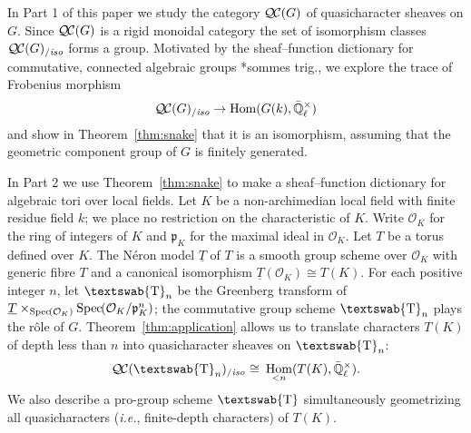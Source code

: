\documentclass[11pt]{amsart}
\newcommand{\mathswab}[1]{\operatorname{\textswab{#1}}}
\theoremstyle{plain}
\theoremstyle{definition}
\theoremstyle{remark}
\newcommand{\Spec}[1]{{\operatorname{Spec}\hskip-1pt( #1 )}}
\newcommand{\EE}{\mathbb{\bar Q}_\ell}
\newcommand{\OK}{\mathcal{O}_K}
\newcommand{\pK}{\mathfrak{p}_K}
\newcommand{\Fq}{k}
\newcommand{\EEx}{\EE^\times}
\DeclareMathOperator{\Hom}{Hom}
\newcommand{\iso}{{\ \cong\ }}
\newcommand{\GN}[1]{\mathswab{#1}}
\newcommand{\TT}{\underline{T}}
\newcommand{\QC}{{\mathcal{Q\hskip-0.8pt C}}}
\newcommand{\QCiso}[1]{\QC(#1)_{/\textit{iso}}}
\begin{document}
In Part 1 of this paper we study the category $\QC(G)$ of quasicharacter sheaves on $G$.
Since $\QC(G)$ is a rigid monoidal category
the set of isomorphism classes $\QCiso{G}$ forms a group.
Motivated by the sheaf--function dictionary for commutative, connected
algebraic groups \cite{deligne:SGA4.5}*{sommes trig.}, 
we explore the trace of Frobenius morphism
\[
\QCiso{G} \to \Hom(G(\Fq), \EEx)
\]
and show in Theorem~\ref{thm:snake} that it is an isomorphism, 
assuming that the geometric component group of $G$ is finitely generated.

In Part 2 we use Theorem~\ref{thm:snake} to make a sheaf--function dictionary
for algebraic tori over local fields.  Let $K$ be a non-archimedian local field
with finite residue field $\Fq$; we place no restriction on the characteristic of $K$.
Write $\OK$ for the ring of integers of $K$ and $\pK$ for the maximal ideal in $\OK$.
Let $T$ be a torus defined over $K$.  The N\'eron model $\TT$ of $T$
is a smooth group scheme over $\OK$ with generic fibre $T$ and a canonical isomorphism
$\TT(\OK) \cong T(K)$.  For each positive integer $n$, let $\GN{T}_n$ be the
Greenberg transform of $\TT \times_{\Spec{\OK}} \Spec{\OK/\pK^n}$; the commutative
group scheme $\GN{T}_n$ plays the r\^{o}le of $G$.  Theorem~\ref{thm:application}
allows us to translate characters $T(K)$ of depth less than $n$ into quasicharacter sheaves on $\GN{T}_n$:
\[
\QCiso{\GN{T}_n} 
\iso
\Hom_{< n}(T(K),\EEx).
\]  
We also describe a pro-group scheme $\GN{T}$ simultaneously geometrizing all quasicharacters ({\it i.e.}, finite-depth characters) of $T(K)$.
\end{document}
